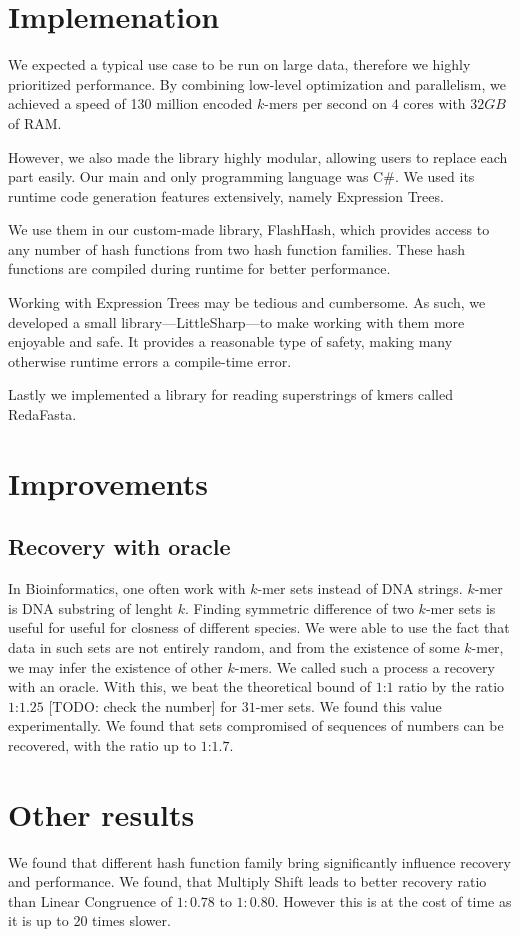 \section*{Implemenation}
We expected a typical use case to be run on large data, therefore we highly prioritized performance. By combining low-level optimization and parallelism, we achieved a speed of 130 million encoded $k$-mers per second on $4$ cores with $32GB$ of RAM. 

However, we also made the library highly modular, allowing users to replace each part easily. Our main and only programming language was C\#. We used its runtime code generation features extensively, namely Expression Trees. 

We use them in our custom-made library, FlashHash, which provides access to any number of hash functions from two hash function families. These hash functions are compiled during runtime for better performance.

Working with Expression Trees may be tedious and cumbersome. As such, we developed a small library—LittleSharp—to make working with them more enjoyable and safe. It provides a reasonable type of safety, making many otherwise runtime errors a compile-time error.

Lastly we implemented a library for reading superstrings of kmers called RedaFasta. 

\section*{Improvements}

\subsection*{Recovery with oracle}
In Bioinformatics, one often work with $k$-mer sets instead of DNA strings. $k$-mer is DNA substring of lenght $k$. Finding symmetric difference of two $k$-mer sets is useful for useful for closness of different species. 
We were able to use the fact that data in such sets are not entirely random, and from the existence of some $k$-mer, we may infer the existence of other $k$-mers. We called such a process a recovery with 
an oracle. With this, we beat the theoretical bound of $1$:$1$ ratio by the ratio $1$:$1.25$ [TODO: check the number] for $31$-mer sets. We found this value experimentally.
We found that sets compromised of sequences of numbers can be recovered, with the ratio up to $1$:$1.7$.



\section*{Other results}
We found that different hash function family bring significantly influence recovery and performance. We found, that Multiply Shift leads to better recovery ratio than Linear Congruence of $1:0.78$ to $1:0.80$. However this is at the cost of time as it is up to $20$ times slower.  